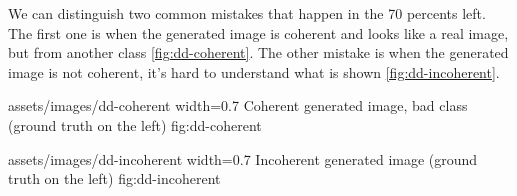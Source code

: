 We can distinguish two common mistakes that happen in the 70 percents left. The
first one is when the generated image is coherent and looks like a real image,
but from another class \cref{fig:dd-coherent}. The other mistake is when the
generated image is not coherent, it's hard to understand what is shown
\cref{fig:dd-incoherent}.

\insertfigure
    {assets/images/dd-coherent}
    {width=0.7\textwidth}
    {Coherent generated image, bad class (ground truth on the left)}
    {fig:dd-coherent}

\insertfigure
    {assets/images/dd-incoherent}
    {width=0.7\textwidth}
    {Incoherent generated image (ground truth on the left)}
    {fig:dd-incoherent}